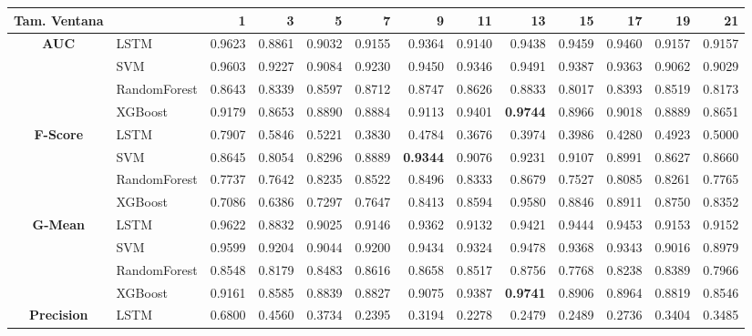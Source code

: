 \begin{table}[h]
\centering
\begin{adjustbox}{max width=15cm}
\begin{tabular}{|c|l|r|r|r|r|r|r|r|r|r|r|r|}

	\hline
	\textbf{Tam. Ventana}&         &      1  &      3  &      5  &      7  &      9  &      11 &      13 &      15 &      17 &      19 &      21 \\
	\hline
	\textbf{AUC} & LSTM &  0.9623 &  0.8861 &  0.9032 &  0.9155 &  0.9364 &  0.9140 &  0.9438 &  0.9459 &  0.9460 &  0.9157 &  0.9157 \\
	& SVM &  0.9603 &  0.9227 &  0.9084 &  0.9230 &  0.9450 &  0.9346 &  0.9491 &  0.9387 &  0.9363 &  0.9062 &  0.9029 \\
	& RandomForest &  0.8643 &  0.8339 &  0.8597 &  0.8712 &  0.8747 &  0.8626 &  0.8833 &  0.8017 &  0.8393 &  0.8519 &  0.8173 \\
	& XGBoost &  0.9179 &  0.8653 &  0.8890 &  0.8884 &  0.9113 &  0.9401 &  \textbf{0.9744} &  0.8966 &  0.9018 &  0.8889 &  0.8651 \\
	\hline
	\textbf{F-Score} & LSTM &  0.7907 &  0.5846 &  0.5221 &  0.3830 &  0.4784 &  0.3676 &  0.3974 &  0.3986 &  0.4280 &  0.4923 &  0.5000 \\
	& SVM &  0.8645 &  0.8054 &  0.8296 &  0.8889 &  \textbf{0.9344} &  0.9076 &  0.9231 &  0.9107 &  0.8991 &  0.8627 &  0.8660 \\
	& RandomForest &  0.7737 &  0.7642 &  0.8235 &  0.8522 &  0.8496 &  0.8333 &  0.8679 &  0.7527 &  0.8085 &  0.8261 &  0.7765 \\
	& XGBoost &  0.7086 &  0.6386 &  0.7297 &  0.7647 &  0.8413 &  0.8594 &  0.9580 &  0.8846 &  0.8911 &  0.8750 &  0.8352 \\
	\hline
	\textbf{G-Mean} & LSTM &  0.9622 &  0.8832 &  0.9025 &  0.9146 &  0.9362 &  0.9132 &  0.9421 &  0.9444 &  0.9453 &  0.9153 &  0.9152 \\
	& SVM &  0.9599 &  0.9204 &  0.9044 &  0.9200 &  0.9434 &  0.9324 &  0.9478 &  0.9368 &  0.9343 &  0.9016 &  0.8979 \\
	& RandomForest &  0.8548 &  0.8179 &  0.8483 &  0.8616 &  0.8658 &  0.8517 &  0.8756 &  0.7768 &  0.8238 &  0.8389 &  0.7966 \\
	& XGBoost &  0.9161 &  0.8585 &  0.8839 &  0.8827 &  0.9075 &  0.9387 &  \textbf{0.9741} &  0.8906 &  0.8964 &  0.8819 &  0.8546 \\
	\hline
	\textbf{Precision} & LSTM &  0.6800 &  0.4560 &  0.3734 &  0.2395 &  0.3194 &  0.2278 &  0.2479 &  0.2489 &  0.2736 &  0.3404 &  0.3485 \\

\end{tabular}
\end{adjustbox}
\end{table}
